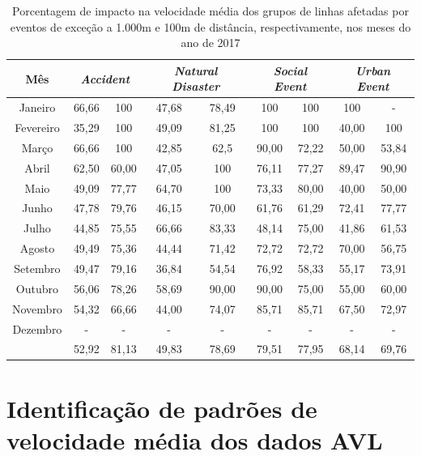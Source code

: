 \documentclass[
	12pt,				%
	oneside,			%
	a4paper,			%
	english,			%
	brazil				%
	]{abntex2ppgsi}
\begin{document}
{{\begin{table}[!htb]
\centering
\caption {Porcentagem de impacto na velocidade média dos grupos de linhas afetadas por eventos de exceção a 1.000m e 100m de distância, respectivamente, nos meses do ano de 2017}
\label{tab:exceptEventVelocityImpAllShapes}
\begin{tabular}{c|cc|cc|cc|cc}
\toprule
\textbf{Mês} & \multicolumn{2}{c}{\textit{\textbf{Accident}}} & \multicolumn{2}{c}{\textit{\textbf{Natural Disaster}}} & \multicolumn{2}{c}{\textit{\textbf{Social Event}}} &
\multicolumn{2}{c}{\textit{\textbf{Urban Event}}}\\
\midrule
Janeiro & 66,66 &  100 & 
 47,68 &  78,49 & 
 100 & 100 &
 100 & - \\
\hline
Fevereiro & 35,29  &  100 &
 49,09 &  81,25 &
 100 & 100 &
 40,00 & 100 \\
\hline
Março  & 66,66  &  100 & 
 42,85 &  62,5 &
90,00 & 72,22 &
50,00 & 53,84 \\
\hline
Abril & 62,50 & 60,00 & 
47,05  & 100 & 
76,11 & 77,27 & 
89,47 &  90,90\\
\hline
Maio & 49,09 &  77,77 &
64,70 &  100 &
73,33 & 80,00 &
40,00 & 50,00 \\
\hline
Junho & 47,78 &  79,76 &
 46,15 &  70,00 &
 61,76 & 61,29 &
72,41 & 77,77 \\
\hline
Julho & 44,85  &  75,55 &
 66,66  & 83,33 &
48,14  & 75,00 &
41,86 & 61,53 \\
\hline
Agosto & 49,49 & 75,36 &
  44,44 & 71,42 &
  72,72 & 72,72 & 
70,00  & 56,75 \\
\hline
Setembro & 49,47  & 79,16 &
36,84  & 54,54 &
76,92  & 58,33 & 
55,17 & 73,91 \\
\hline
Outubro & 56,06 & 78,26 &
58,69  & 90,00 &
90,00  & 75,00 &
55,00 & 60,00 \\
\hline
Novembro & 54,32 & 66,66 &
 44,00 & 74,07 &
85,71  & 85,71 &
67,50  & 72,97 \\
\hline
Dezembro & - & - & - & - & - & - & - & -  \\
\midrule
{} & 52,92 & 81,13 & 49,83 & 78,69 & 79,51 & 77,95 & 68,14 & 69,76  \\
\bottomrule
\end{tabular}
\end{table}


\chapter{Identificação de padrões de velocidade média dos dados AVL}

}}
\end{document}
